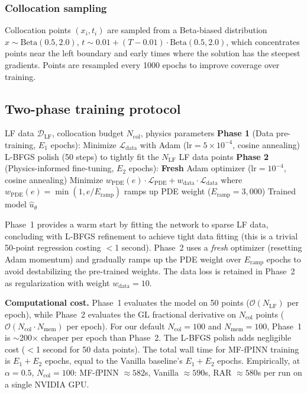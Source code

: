 \documentclass[preprint,12pt]{elsarticle}
\newcommand{\Lcal}{\mathcal{L}}
\newcommand{\Ncol}{N_{\mathrm{col}}}
\newcommand{\NLF}{N_{\mathrm{LF}}}
\begin{document}
\subsubsection{Collocation sampling}

Collocation points $(x_i, t_i)$ are sampled from a Beta-biased distribution $x \sim \mathrm{Beta}(0.5, 2.0)$, $t \sim 0.01 + (T - 0.01) \cdot \mathrm{Beta}(0.5, 2.0)$, which concentrates points near the left boundary and early times where the solution has the steepest gradients. Points are resampled every 1000 epochs to improve coverage over training.

\subsection{Two-phase training protocol}
\label{sec:twophase}

\begin{algorithm}
\caption{MF-fPINN Two-Phase Training}
\label{alg:mf}
\begin{algorithmic}[1]
\REQUIRE LF data $\mathcal{D}_{\mathrm{LF}}$, collocation budget $\Ncol$, physics parameters
\STATE \textbf{Phase 1} (Data pre-training, $E_1$ epochs):
\STATE \quad Minimize $\Lcal_{\mathrm{data}}$ with Adam ($\mathrm{lr} = 5 \times 10^{-4}$, cosine annealing)
\STATE \quad L-BFGS polish (50 steps) to tightly fit the $\NLF$ LF data points
\STATE \textbf{Phase 2} (Physics-informed fine-tuning, $E_2$ epochs):
\STATE \quad \textbf{Fresh} Adam optimizer ($\mathrm{lr} = 10^{-4}$, cosine annealing)
\STATE \quad Minimize $w_{\mathrm{PDE}}(e) \cdot \Lcal_{\mathrm{PDE}} + w_{\mathrm{data}} \cdot \Lcal_{\mathrm{data}}$
\STATE \quad where $w_{\mathrm{PDE}}(e) = \min(1, e/E_{\mathrm{ramp}})$ ramps up PDE weight ($E_{\mathrm{ramp}} = 3{,}000$)
\RETURN Trained model $\hat{u}_\theta$
\end{algorithmic}
\end{algorithm}

Phase~1 provides a warm start by fitting the network to sparse LF data, concluding with L-BFGS refinement to achieve tight data fitting (this is a trivial 50-point regression costing $<$1 second). Phase~2 uses a \emph{fresh} optimizer (resetting Adam momentum) and gradually ramps up the PDE weight over $E_{\mathrm{ramp}}$ epochs to avoid destabilizing the pre-trained weights. The data loss is retained in Phase~2 as regularization with weight $w_{\mathrm{data}} = 10$.

\textbf{Computational cost.} Phase~1 evaluates the model on 50 points ($\mathcal{O}(\NLF)$ per epoch), while Phase~2 evaluates the GL fractional derivative on $\Ncol$ points ($\mathcal{O}(\Ncol \cdot N_{\mathrm{mem}})$ per epoch). For our default $\Ncol = 100$ and $N_{\mathrm{mem}} = 100$, Phase~1 is $\sim$200$\times$ cheaper per epoch than Phase~2. The L-BFGS polish adds negligible cost ($<$1 second for 50 data points). The total wall time for MF-fPINN training is $E_1 + E_2$ epochs, equal to the Vanilla baseline's $E_1 + E_2$ epochs. Empirically, at $\alpha = 0.5$, $\Ncol = 100$: MF-fPINN $\approx 582$s, Vanilla $\approx 590$s, RAR $\approx 580$s per run on a single NVIDIA GPU.
\end{document}
